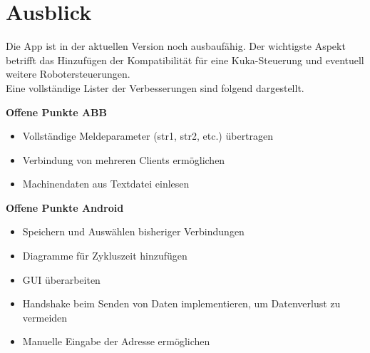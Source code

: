 \chapter{Ausblick}
\label{sec:Ausblick}
Die App ist in der aktuellen Version noch ausbaufähig. Der wichtigste 
Aspekt betrifft das Hinzufügen der Kompatibilität für eine Kuka-Steuerung und 
eventuell weitere Robotersteuerungen.\\
Eine vollständige Lister der Verbesserungen sind folgend dargestellt.

\textbf{Offene Punkte ABB}
\begin{itemize}
\item Vollständige Meldeparameter (str1, str2, etc.) übertragen
\item Verbindung von mehreren Clients ermöglichen
\item Machinendaten aus Textdatei einlesen
\end{itemize}

\textbf{Offene Punkte Android}
\begin{itemize}
\item Speichern und Auswählen bisheriger Verbindungen
\item Diagramme für Zykluszeit hinzufügen
\item GUI überarbeiten
\item Handshake beim Senden von Daten implementieren, um Datenverlust zu 
vermeiden
\item Manuelle Eingabe der Adresse ermöglichen
\end{itemize}